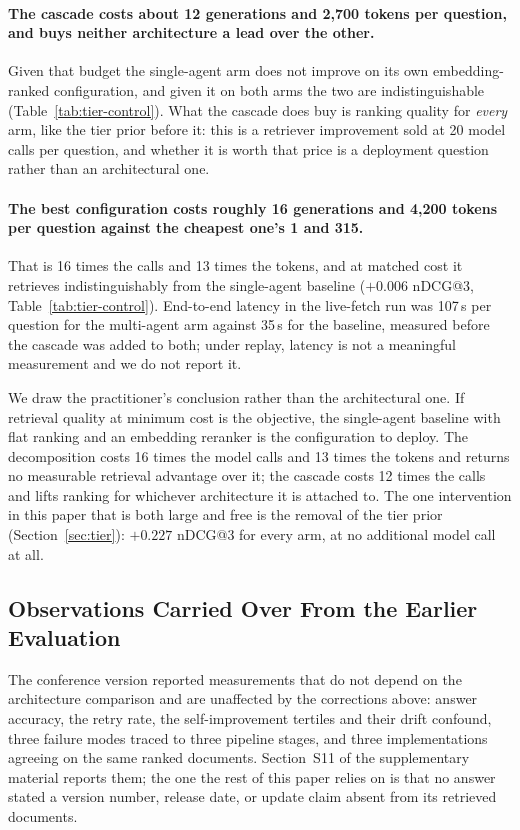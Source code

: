 \documentclass[acmsmall,review,anonymous,screen]{acmart}
\begin{document}
\paragraph{The cascade costs about 12 generations and 2{,}700 tokens per
question, and buys neither architecture a lead over the other.} Given that
budget the single-agent arm does not improve on its own embedding-ranked
configuration, and given it on both arms the two are indistinguishable
(Table~\ref{tab:tier-control}). What the cascade does buy is ranking quality
for \emph{every} arm, like the tier prior before it: this is a retriever
improvement sold at 20 model calls per question, and whether it is worth that
price is a deployment question rather than an architectural one.

\paragraph{The best configuration costs roughly 16 generations and 4{,}200
tokens per question against the cheapest one's 1 and 315.} That is 16 times the
calls and 13 times the tokens, and at matched cost it retrieves
indistinguishably from the single-agent baseline ($+0.006$ nDCG@3,
Table~\ref{tab:tier-control}). End-to-end latency in the
live-fetch run was 107\,s per question for the multi-agent arm against
35\,s for the baseline, measured before the cascade was added to both; under
replay, latency is not a meaningful measurement and we do not report it.

We draw the practitioner's conclusion rather than the architectural one. If
retrieval quality at minimum cost is the objective, the single-agent baseline
with flat ranking and an embedding reranker is the configuration to deploy.
The decomposition costs 16 times the model calls and 13 times the tokens and
returns no measurable retrieval advantage over it; the cascade costs 12 times
the calls and lifts ranking for whichever architecture it is attached to. The
one intervention in this paper that is both large and free is the removal of
the tier prior (Section~\ref{sec:tier}): $+0.227$ nDCG@3 for every arm, at no
additional model call at all.

\subsection{Observations Carried Over From the Earlier Evaluation}
\label{sec:carried-over}

The conference version reported measurements that do not depend on the
architecture comparison and are unaffected by the corrections above: answer
accuracy, the retry rate, the self-improvement tertiles and their drift
confound, three failure modes traced to three pipeline stages, and three
implementations agreeing on the same ranked documents. Section~S11 of the
supplementary material reports them; the one the rest of this paper relies on is
that no answer stated a version number, release date, or update claim absent
from its retrieved documents.
\end{document}
